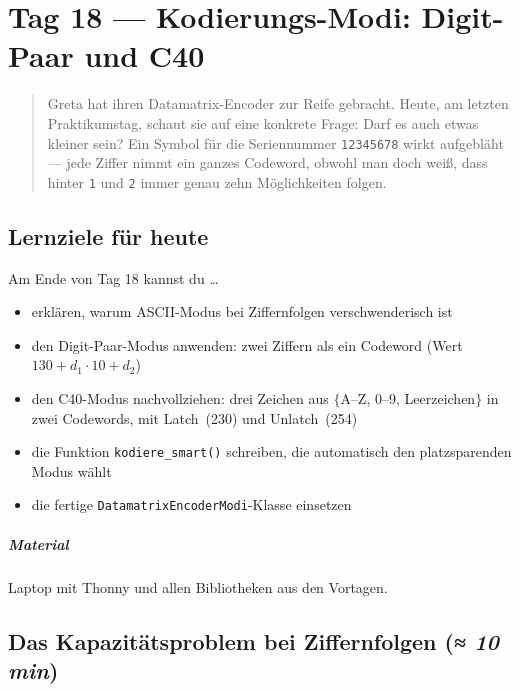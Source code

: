 \chapter{Tag 18 — Kodierungs-Modi: Digit-Paar und C40}

\begin{quote}
Greta hat ihren Datamatrix-Encoder zur Reife gebracht. Heute, am letzten
Praktikumstag, schaut sie auf eine konkrete Frage: Darf es auch etwas
kleiner sein? Ein Symbol für die Seriennummer \texttt{12345678} wirkt
aufgebläht — jede Ziffer nimmt ein ganzes Codeword, obwohl man doch weiß,
dass hinter \texttt{1} und \texttt{2} immer genau zehn Möglichkeiten folgen.
\end{quote}

\section*{Lernziele für heute}

Am Ende von Tag 18 kannst du \dots

\begin{itemize}
\item erklären, warum ASCII-Modus bei Ziffernfolgen verschwenderisch ist
\item den Digit-Paar-Modus anwenden: zwei Ziffern als ein Codeword
  (Wert~$130 + d_1 \cdot 10 + d_2$)
\item den C40-Modus nachvollziehen: drei Zeichen aus $\{$A–Z, 0–9, Leerzeichen$\}$
  in zwei Codewords, mit Latch~(230) und Unlatch~(254)
\item die Funktion \texttt{kodiere\_smart()} schreiben, die automatisch den
  platzsparenden Modus wählt
\item die fertige \texttt{DatamatrixEncoderModi}-Klasse einsetzen
\end{itemize}

\paragraph{Material} Laptop mit Thonny und allen Bibliotheken aus den Vortagen.

\section{Das Kapazitätsproblem bei Ziffernfolgen \normalfont(\textit{≈ 10 min})}

